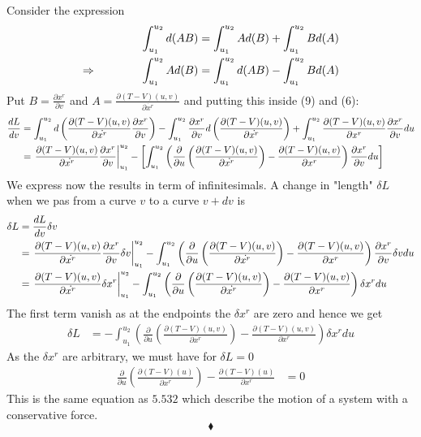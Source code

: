 Consider the expression
\begin{align}
\int_{u_1}^{u_2}d(AB) &= \int_{u_1}^{u_2}Ad(B) + \int_{u_1}^{u_2}Bd(A)\\
\Rightarrow \quad\quad\quad\quad \int_{u_1}^{u_2}Ad(B)&=\int_{u_1}^{u_2}d(AB) -\int_{u_1}^{u_2}Bd(A)
\end{align}
Put $B= \frac{\partial x^r}{\partial v}$ and $A=  \frac{\partial (T-V)(u,v)}{\partial \dot{x^r}}$ and putting this inside (9) and (6):
\begin{align}
\dv{L}{v} &= \int_{u_1}^{u_2}d\left(\frac{\partial (T-V)(u,v)}{\partial \dot{x^r}}\frac{\partial x^r}{\partial v} \right)-\int_{u_1}^{u_2}\frac{\partial x^r}{\partial v} d \left(\frac{ \partial (T-V)(u,v)}{\partial \dot{x^r}} \right)+\int_{u_1}^{u_2}\frac{\partial (T-V)(u,v)}{\partial x^r}\frac{\partial x^r}{\partial v}du\\
&=\left.\frac{\partial (T-V)(u,v)}{\partial \dot{x^r}}\frac{\partial x^r}{\partial v} \right|_{u_1}^{u_2}-\left[\int_{u_1}^{u_2}\left(\frac{\partial}{\partial u} \left(\frac{ \partial (T-V)(u,v)}{\partial \dot{x^r}} \right)-\frac{\partial (T-V)(u,v)}{\partial x^r}\right)\frac{\partial x^r}{\partial v} du \right]
\end{align}
We express now the results in term of infinitesimals. A change in "length" $\delta L$ when we pas from a curve $v$ to a curve $v+dv$ is
\begin{align}
\delta L &= \dv{L}{v}\delta v\\
&= \left.\frac{\partial (T-V)(u,v)}{\partial \dot{x^r}}\frac{\partial x^r}{\partial v} \delta v\right|_{u_1}^{u_2}-\int_{u_1}^{u_2}\left(\frac{\partial}{\partial u} \left(\frac{ \partial (T-V)(u,v)}{\partial \dot{x^r}} \right)-\frac{\partial (T-V)(u,v)}{\partial x^r}\right)\frac{\partial x^r}{\partial v}\delta v du\\
&= \left.\frac{\partial (T-V)(u,v)}{\partial \dot{x^r}}\delta x^r\right|_{u_1}^{u_2}-\int_{u_1}^{u_2}\left(\frac{\partial}{\partial u} \left(\frac{ \partial (T-V)(u,v)}{\partial \dot{x^r}} \right)-\frac{\partial (T-V)(u,v)}{\partial x^r}\right)\delta x^r du
\end{align}
The first term vanish as at the endpoints  the $\delta x^r$ are zero and hence we get
\begin{align}
\delta L &= -\int_{u_1}^{u_2}\left(\frac{\partial}{\partial u} \left(\frac{ \partial (T-V)(u,v)}{\partial \dot{x^r}} \right)-\frac{\partial (T-V)(u,v)}{\partial x^r}\right)\delta x^r du
\end{align}
As the $\delta x^r$ are arbitrary, we must have for $\delta L =0$
\begin{align}
\frac{\partial}{\partial u} \left(\frac{ \partial (T-V)(u)}{\partial \dot{x^r}} \right)-\frac{\partial (T-V)(u)}{\partial x^r}&=0
\end{align}
This is the same equation as $\mathbf{5.532}$ which describe the motion of a system with a conservative force. 
$$\blacklozenge$$
\newpage

